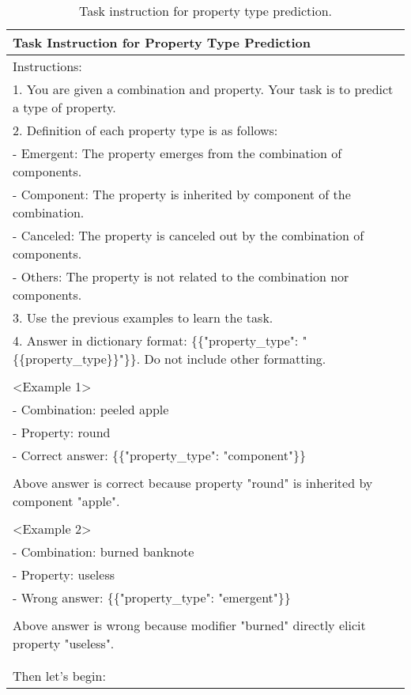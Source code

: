 \begin{table*}[htbp]
\scriptsize
\centering
\begin{tabular}{@{}p{\linewidth}@{}}
\toprule
\textbf{Task Instruction for Property Type Prediction}\\
\midrule
Instructions:\\
1. You are given a combination and property. Your task is to predict a type of property.\\
2. Definition of each property type is as follows:\\
    - Emergent: The property emerges from the combination of components.\\
    - Component: The property is inherited by component of the combination.\\
    - Canceled: The property is canceled out by the combination of components.\\
    - Others: The property is not related to the combination nor components.\\
3. Use the previous examples to learn the task.\\
4. Answer in dictionary format: \{\{"property\_type": "\{\{property\_type\}\}"\}\}. Do not include other formatting.\\
    \\
<Example 1>\\
- Combination: peeled apple\\
- Property: round\\
- Correct answer: \{\{"property\_type": "component"\}\}\\
\\
Above answer is correct because property "round" is inherited by component "apple".\\
\\
<Example 2>\\
- Combination: burned banknote\\
- Property: useless\\
- Wrong answer: \{\{"property\_type": "emergent"\}\}\\
\\
Above answer is wrong because modifier "burned" directly elicit property "useless".\\
\\
\\
Then let's begin:\\
\bottomrule
\end{tabular}
    \caption{Task instruction for property type prediction.}
    \label{tab:pt_prompt}
\end{table*}